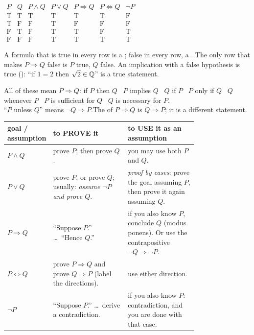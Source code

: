\begin{key}
\begin{center}
$\begin{array}{cc|ccccc}
P & Q & P\wedge Q & P\vee Q & P\Rightarrow Q & P\Leftrightarrow Q & \neg P\\\hline
\mathrm{T}&\mathrm{T}&\mathrm{T}&\mathrm{T}&\mathrm{T}&\mathrm{T}&\mathrm{F}\\
\mathrm{T}&\mathrm{F}&\mathrm{F}&\mathrm{T}&\mathrm{F}&\mathrm{F}&\mathrm{F}\\
\mathrm{F}&\mathrm{T}&\mathrm{F}&\mathrm{T}&\mathrm{T}&\mathrm{F}&\mathrm{T}\\
\mathrm{F}&\mathrm{F}&\mathrm{F}&\mathrm{T}&\mathrm{T}&\mathrm{T}&\mathrm{T}
\end{array}$
\end{center}
A formula that is true in every row is a ; false in every row, a . The only row that makes $P\Rightarrow Q$ false is $P$ true, $Q$ false. An implication with a false hypothesis is true (): ``if $1=2$ then $\sqrt2\in\mathbb{Q}$'' is a true statement.
\end{key}

\begin{key}
All of these mean $P\Rightarrow Q$: \quad if $P$ then $Q$ \textperiodcentered\ $P$ implies $Q$ \textperiodcentered\ $Q$ if $P$ \textperiodcentered\ $P$ only if $Q$ \textperiodcentered\ $Q$ whenever $P$ \textperiodcentered\ $P$ is sufficient for $Q$ \textperiodcentered\ $Q$ is necessary for $P$.\\
``$P$ unless $Q$'' means $\neg Q\Rightarrow P$.\quad The  of $P\Rightarrow Q$ is $Q\Rightarrow P$; it is a different statement.
\end{key}

\begin{strategy}
\begin{center}\small
\begin{tabular}{@{}l p{0.40\linewidth} p{0.37\linewidth}@{}}
\toprule
goal / assumption & \textbf{to PROVE it} & \textbf{to USE it as an assumption}\\
\midrule
$P\wedge Q$ & prove $P$; then prove $Q$. & you may use both $P$ and $Q$.\\[2pt]
$P\vee Q$ & prove $P$, or prove $Q$; usually: \emph{assume $\neg P$ and prove $Q$}. & \emph{proof by cases}: prove the goal assuming $P$, then prove it again assuming $Q$.\\[2pt]
$P\Rightarrow Q$ & ``Suppose $P$.'' \dots\ ``Hence $Q$.'' & if you also know $P$, conclude $Q$ (modus ponens). Or use the contrapositive $\neg Q\Rightarrow\neg P$.\\[2pt]
$P\Leftrightarrow Q$ & prove $P\Rightarrow Q$ and prove $Q\Rightarrow P$ (label the directions). & use either direction.\\[2pt]
$\neg P$ & ``Suppose $P$.'' \dots\ derive a contradiction. & if you also know $P$: contradiction, and you are done with that case.\\
\bottomrule
\end{tabular}
\end{center}
\end{strategy}

